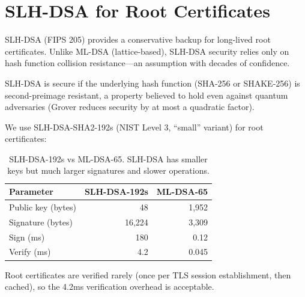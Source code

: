 \section{SLH-DSA for Root Certificates}

\label{sec:slhdsa}

SLH-DSA (FIPS 205) provides a conservative backup for long-lived root
certificates. Unlike ML-DSA (lattice-based), SLH-DSA security relies only on
hash function collision resistance---an assumption with decades of confidence.

\begin{definition}
SLH-DSA is secure if the underlying hash function (SHA-256 or SHAKE-256) is
second-preimage resistant, a property believed to hold even against quantum
adversaries (Grover reduces security by at most a quadratic factor).
\end{definition}

We use SLH-DSA-SHA2-192s (NIST Level 3, ``small'' variant) for root
certificates:

\begin{table}[H]
\centering
\small
\begin{tabular}{lrr}
\toprule
\textbf{Parameter} & \textbf{SLH-DSA-192s} & \textbf{ML-DSA-65} \\
\midrule
Public key (bytes) & 48 & 1,952 \\
Signature (bytes) & 16,224 & 3,309 \\
Sign (ms) & 180 & 0.12 \\
Verify (ms) & 4.2 & 0.045 \\
\bottomrule
\end{tabular}
\caption{SLH-DSA-192s vs ML-DSA-65. SLH-DSA has smaller keys but much larger
signatures and slower operations.}
\label{tab:slhdsa}
\end{table}

Root certificates are verified rarely (once per TLS session establishment, then
cached), so the 4.2ms verification overhead is acceptable.

